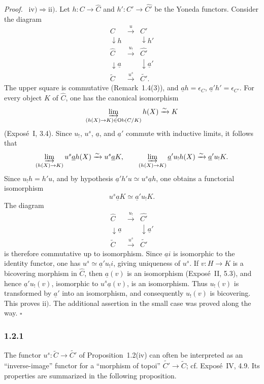 \documentclass[11pt]{article}
\newcommand{\Ob}{\operatorname{Ob}}
\newcommand{\qedtext}{\hfill\(\square\)}
\newenvironment{prooftext}{\par\noindent\emph{Proof.}\ }{\par\medskip}
\begin{document}
\begin{prooftext}
\emph{\(\mathrm{iv})\Rightarrow\mathrm{ii})\).} Let \(h:C\to\widehat C\) and \(h':C'\to\widehat{C'}\) be the Yoneda functors. Consider the diagram
\[
\begin{array}{ccc}
C & \xrightarrow{u} & C'\\
\downarrow h && \downarrow h'\\
\widehat C & \xrightarrow{u_!} & \widehat{C'}\\
\downarrow\underline a && \downarrow\underline a'\\
\widetilde C & \xrightarrow{u^s} & \widetilde{C'}.
\end{array}
\]
The upper square is commutative (Remark~1.4(3)), and \(\underline ah=\epsilon_C\), \(\underline a'h'=\epsilon_{C'}\). For every object \(K\) of \(\widehat C\), one has the canonical isomorphism
\[
\varinjlim_{(h(X)\to K)\in\Ob(C/K)}h(X)\xrightarrow{\sim}K
\]
(Expos\'e~I, 3.4). Since \(u_!\), \(u^s\), \(\underline a\), and \(\underline a'\) commute with inductive limits, it follows that
\[
\varinjlim_{(h(X)\to K)} u^s\underline a h(X)\xrightarrow{\sim}u^s\underline aK,
\qquad
\varinjlim_{(h(X)\to K)}\underline a'u_!h(X)\xrightarrow{\sim}\underline a'u_!K.
\]
Since \(u_!h=h'u\), and by hypothesis \(\underline a'h'u\simeq u^s\underline a h\), one obtains a functorial isomorphism
\[
u^s\underline aK\simeq \underline a'u_!K.
\]
The diagram
\[
\begin{array}{ccc}
\widehat C & \xrightarrow{u_!} & \widehat{C'}\\
\downarrow\underline a && \downarrow\underline a'\\
\widetilde C & \xrightarrow{u^s} & \widetilde{C'}
\end{array}
\]
is therefore commutative up to isomorphism. Since \(\underline ai\) is isomorphic to the identity functor, one has \(u^s\simeq\underline a'u_!i\), giving uniqueness of \(u^s\). If \(v:H\to K\) is a bicovering morphism in \(\widehat C\), then \(\underline a(v)\) is an isomorphism (Expos\'e~II, 5.3), and hence \(\underline a'u_!(v)\), isomorphic to \(u^s\underline a(v)\), is an isomorphism. Thus \(u_!(v)\) is transformed by \(\underline a'\) into an isomorphism, and consequently \(u_!(v)\) is bicovering. This proves \(\mathrm{ii})\). The additional assertion in the small case was proved along the way. \qedtext
\end{prooftext}

\subsubsection*{1.2.1}
The functor \(u^s:\widetilde C\to\widetilde{C'}\) of Proposition~1.2(iv) can often be interpreted as an ``inverse-image'' functor for a ``morphism of topoi'' \(\widetilde{C'}\to\widetilde C\); cf. Expos\'e~IV, 4.9. Its properties are summarized in the following proposition.
\end{document}
